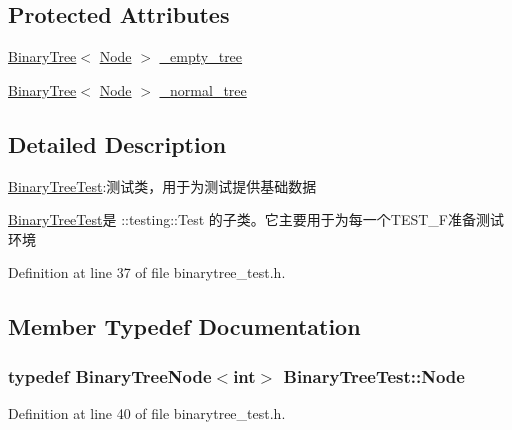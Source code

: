 \subsection*{Protected Attributes}
\begin{DoxyCompactItemize}
\item 
\hyperlink{struct_introduction_to_algorithm_1_1_tree_algorithm_1_1_binary_tree}{Binary\+Tree}$<$ \hyperlink{class_binary_tree_test_ad4aa3d3d01bf0b1b820fffa58e81e15b}{Node} $>$ \hyperlink{class_binary_tree_test_a66e48418e5449b663b2608f4914100d5}{\+\_\+empty\+\_\+tree}
\item 
\hyperlink{struct_introduction_to_algorithm_1_1_tree_algorithm_1_1_binary_tree}{Binary\+Tree}$<$ \hyperlink{class_binary_tree_test_ad4aa3d3d01bf0b1b820fffa58e81e15b}{Node} $>$ \hyperlink{class_binary_tree_test_a36a98db1094f92c94b7d7893c8975f57}{\+\_\+normal\+\_\+tree}
\end{DoxyCompactItemize}


\subsection{Detailed Description}
\hyperlink{class_binary_tree_test}{Binary\+Tree\+Test}\+:测试类，用于为测试提供基础数据 

{\ttfamily \hyperlink{class_binary_tree_test}{Binary\+Tree\+Test}}是 {\ttfamily \+::testing\+::\+Test} 的子类。它主要用于为每一个{\ttfamily T\+E\+S\+T\+\_\+\+F}准备测试环境 

Definition at line 37 of file binarytree\+\_\+test.\+h.



\subsection{Member Typedef Documentation}
\hypertarget{class_binary_tree_test_ad4aa3d3d01bf0b1b820fffa58e81e15b}{}
\subsubsection[{Node}]{\setlength{\rightskip}{0pt plus 5cm}typedef {\bf Binary\+Tree\+Node}$<$int$>$ {\bf Binary\+Tree\+Test\+::\+Node}}\label{class_binary_tree_test_ad4aa3d3d01bf0b1b820fffa58e81e15b}


Definition at line 40 of file binarytree\+\_\+test.\+h.




